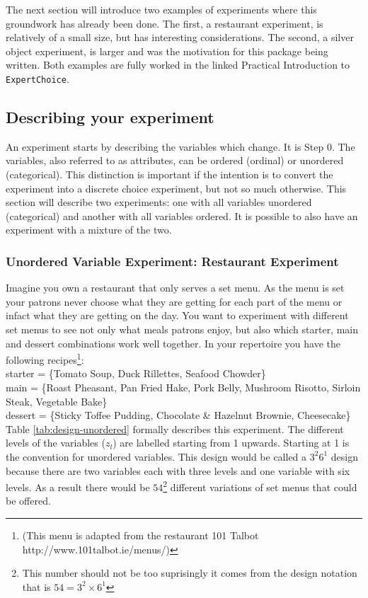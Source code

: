 \documentclass[article, crop=false]{standalone}
\begin{document}
The next section will introduce two examples of experiments where this groundwork has already been done.
The first, a restaurant experiment, is relatively of a small size, but has interesting considerations.
The second, a silver object experiment, is larger and was the motivation for this package being written.
Both examples are fully worked in the linked Practical Introduction to \texttt{ExpertChoice}.

\subsection{Describing your experiment}
An experiment starts by describing the variables which change.
It is Step 0.
The variables, also referred to as attributes, can be ordered (ordinal) or unordered (categorical).
This distinction is important if the intention is to convert the experiment into a discrete choice experiment, but not so much otherwise.
This section will describe two experiments: one with all variables unordered (categorical) and another with all variables ordered.
It is possible to also have an experiment with a mixture of the two.

\subsubsection{Unordered Variable Experiment: Restaurant Experiment}

Imagine you own a restaurant that only serves a set menu.
As the menu is set your patrons never choose what they are getting for each part of the menu or infact what they are getting on the day.
You want to experiment with different set menus to see not only what meals patrons enjoy, but also which starter, main and dessert combinations work well together.
In your repertoire you have the following recipes\footnote{(This menu is adapted from the restaurant 101 Talbot http://www.101talbot.ie/menus/)
}:\\

starter = \{Tomato Soup, Duck Rillettes, Seafood Chowder\} \\
main = \{Roast Pheasant, Pan Fried Hake, Pork Belly, Mushroom Risotto, Sirloin Steak, Vegetable Bake\} \\
dessert = \{Sticky Toffee Pudding, Chocolate \& Hazelnut Brownie, Cheesecake\} \\

Table \ref{tab:design-unordered} formally describes this experiment.
The different levels of the variables ($z_l$) are labelled starting from 1 upwards.
Starting at 1 is the convention for unordered variables.
This design would be called a $3^2 6^1$ design because there are two variables each with three levels and one variable with six levels.
As a result there would be $54$\footnote{This number should not be too suprisingly it comes from the design notation that is $54 = 3^2\times 6^1$} different variations of set menus that could be offered.
\end{document}
